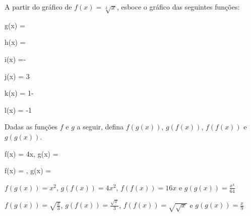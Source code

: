 \begin{exercises*}
\begin{exercise}
  A partir do gráfico de $f(x)=\sqrt[3]{x}$,
  esboce o gráfico das seguintes funções:
  \begin{mathlist}
    \item g(x) = 
    \item h(x) = 
    \item i(x) =-
    \item j(x) = 3
    \item k(x) = 1-
    \item l(x) = -1
  \end{mathlist}

\end{exercise}

\begin{exercise}
  Dadas as funções $f$ e $g$ a seguir,
  defina $f(g(x))$, $g(f(x))$, $f(f(x))$ e $g(g(x))$.
  \begin{mathlist}
    \item f(x) = 4x,       \quad g(x) = 
    \item f(x) = , \quad g(x) = 
  \end{mathlist}

  \begin{answer}
    \begin{alphalist}
      \item $f(g(x))=x^2$,
            $g(f(x))=4x^2$,
            $f(f(x))=16x$ e
            $g(g(x))=\frac{x^4}{64}$
      \item $f(g(x))=\sqrt{\frac{x}{3}}$,
            $g(f(x))=\frac{\sqrt{x}}{3}$,
            $f(f(x))=\sqrt{\sqrt{x}}$ e
            $g(g(x))=\frac{x}{9}$
    \end{alphalist}
  \end{answer}
\end{exercise}


\end{exercises*}
